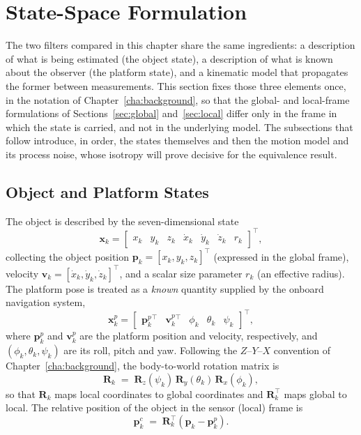 \section{State-Space Formulation}

The two filters compared in this chapter share the same ingredients: a description
of what is being estimated (the object state), a description of what is known
about the observer (the platform state), and a kinematic model that propagates the
former between measurements. This section fixes those three elements once, in the
notation of Chapter~\ref{cha:background}, so that the global- and local-frame
formulations of Sections~\ref{sec:global} and~\ref{sec:local} differ only in the
frame in which the state is carried, and not in the underlying model. The
subsections that follow introduce, in order, the states themselves and then the
motion model and its process noise, whose isotropy will prove decisive for the
equivalence result.

\subsection{Object and Platform States}

The object is described by the seven-dimensional state
\begin{equation}
  \bm{x}_k = \begin{bmatrix} x_k & y_k & z_k & \dot{x}_k & \dot{y}_k & \dot{z}_k & r_k \end{bmatrix}^{\!\top},
  \label{eq:obj_state}
\end{equation}
collecting the object position $\bm{p}_k=[x_k,y_k,z_k]^\top$ (expressed in the
global frame), velocity $\bm{v}_k=[\dot{x}_k,\dot{y}_k,\dot{z}_k]^\top$, and a
scalar size parameter $r_k$ (an effective radius). The platform pose is treated as
a \emph{known} quantity supplied by the onboard navigation system,
\begin{equation}
  \bm{x}^{p}_k = \begin{bmatrix} \bm{p}^{p}_k{}^{\!\top} & \bm{v}^{p}_k{}^{\!\top} & \phi_k & \theta_k & \psi_k \end{bmatrix}^{\!\top},
  \label{eq:plat_state}
\end{equation}
where $\bm{p}^{p}_k$ and $\bm{v}^{p}_k$ are the platform position and velocity,
respectively, and $(\phi_k,\theta_k,\psi_k)$ are its roll, pitch and yaw. Following the $Z$--$Y$--$X$ convention of
Chapter~\ref{cha:background}, the body-to-world rotation matrix is
\begin{equation}
  \bm{R}_k \;=\; \bm{R}_z(\psi_k)\,\bm{R}_y(\theta_k)\,\bm{R}_x(\phi_k),
  \label{eq:rotation}
\end{equation}
so that $\bm{R}_k$ maps local coordinates to global coordinates and
$\bm{R}_k^{\top}$ maps global to local. The relative position of the object in
the sensor (local) frame is
\begin{equation}
  \bm{p}^{c}_k \;=\; \bm{R}_k^{\top}\!\left(\bm{p}_k - \bm{p}^{p}_k\right).
  \label{eq:rel_local}
\end{equation}

